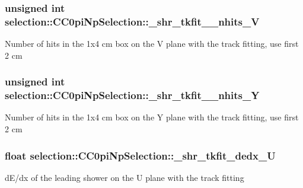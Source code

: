 \subsubsection[{\texorpdfstring{\+\_\+shr\+\_\+tkfit\+\_\+2cm\+\_\+nhits\+\_\+V}{_shr_tkfit_2cm_nhits_V}}]{\setlength{\rightskip}{0pt plus 5cm}unsigned int selection\+::\+C\+C0pi\+Np\+Selection\+::\+\_\+shr\+\_\+tkfit\+\_\+2cm\+\_\+nhits\+\_\+V\hspace{0.3cm}{\ttfamily [private]}}\hypertarget{classselection_1_1CC0piNpSelection_a4d79a5a52fba98286c68079f9a3e04cb}{}\label{classselection_1_1CC0piNpSelection_a4d79a5a52fba98286c68079f9a3e04cb}
Number of hits in the 1x4 cm box on the V plane with the track fitting, use first 2 cm 
\subsubsection[{\texorpdfstring{\+\_\+shr\+\_\+tkfit\+\_\+2cm\+\_\+nhits\+\_\+Y}{_shr_tkfit_2cm_nhits_Y}}]{\setlength{\rightskip}{0pt plus 5cm}unsigned int selection\+::\+C\+C0pi\+Np\+Selection\+::\+\_\+shr\+\_\+tkfit\+\_\+2cm\+\_\+nhits\+\_\+Y\hspace{0.3cm}{\ttfamily [private]}}\hypertarget{classselection_1_1CC0piNpSelection_a267f9073fa07d7c1c5e40b79a935c585}{}\label{classselection_1_1CC0piNpSelection_a267f9073fa07d7c1c5e40b79a935c585}
Number of hits in the 1x4 cm box on the Y plane with the track fitting, use first 2 cm 
\subsubsection[{\texorpdfstring{\+\_\+shr\+\_\+tkfit\+\_\+dedx\+\_\+U}{_shr_tkfit_dedx_U}}]{\setlength{\rightskip}{0pt plus 5cm}float selection\+::\+C\+C0pi\+Np\+Selection\+::\+\_\+shr\+\_\+tkfit\+\_\+dedx\+\_\+U\hspace{0.3cm}{\ttfamily [private]}}\hypertarget{classselection_1_1CC0piNpSelection_aaaef69409457695e2300bf847a13804c}{}\label{classselection_1_1CC0piNpSelection_aaaef69409457695e2300bf847a13804c}
d\+E/dx of the leading shower on the U plane with the track fitting 
